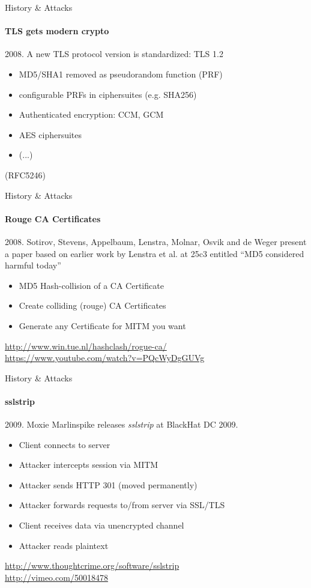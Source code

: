 \documentclass[hyperref={draft}]{beamer}
\begin{document}
\begin{frame}{History \& Attacks}
  \framesubtitle{TLS gets modern crypto}
  2008. A new TLS protocol version is standardized: TLS 1.2
  \begin{itemize}
    \item MD5/SHA1 removed as pseudorandom function (PRF)
    \item configurable PRFs in ciphersuites (e.g. SHA256)
    \item Authenticated encryption: CCM, GCM
    \item AES ciphersuites
    \item (...)
  \end{itemize}
   (RFC5246)
\end{frame}

\begin{frame}{History \& Attacks}
  \framesubtitle{Rouge CA Certificates}
  2008. Sotirov, Stevens, Appelbaum, Lenstra, Molnar, Osvik and de Weger present a paper based on earlier work by Lenstra et al. at 25c3 entitled ``MD5 considered harmful today''

  \begin{itemize}
    \item MD5 Hash-collision of a CA Certificate
    \item Create colliding (rouge) CA Certificates
    \item Generate any Certificate for MITM you want
  \end{itemize}

  \vspace{60px}

  \tiny
  \url{http://www.win.tue.nl/hashclash/rogue-ca/}\\
  \url{https://www.youtube.com/watch?v=PQcWyDgGUVg}\\
\end{frame}

\begin{frame}{History \& Attacks}
  \framesubtitle{sslstrip}
  2009. Moxie Marlinspike releases \emph{sslstrip} at BlackHat DC 2009.

  \begin{itemize}
    \item Client connects to server
    \item Attacker intercepts session via MITM
    \item Attacker sends HTTP 301 (moved permanently)
    \item Attacker forwards requests to/from server via SSL/TLS
    \item Client receives data via unencrypted channel
    \item Attacker reads plaintext
  \end{itemize}
  
  \vspace{50px}

  \tiny
  \url{http://www.thoughtcrime.org/software/sslstrip}\\
  \url{http://vimeo.com/50018478}
\end{frame}
\end{document}
